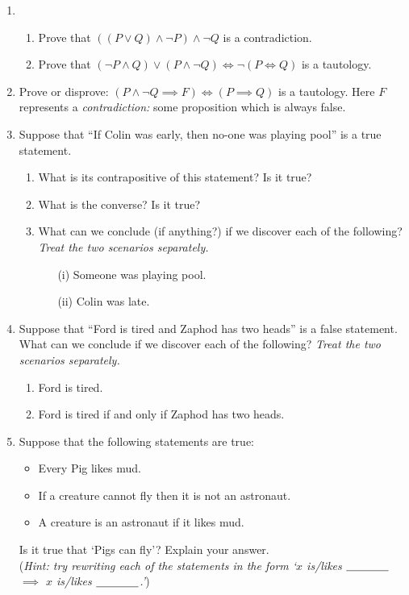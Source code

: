 \begin{enumerate}
  \item\begin{enumerate}
    \item Prove that $((P\vee Q)\wedge \neg P)\wedge\neg Q$ is a contradiction.
  	\item Prove that $(\neg P\wedge Q)\vee(P\wedge\neg Q)\iff\neg(P\iff Q)$ is a tautology.
  \end{enumerate}
  
  \item Prove or disprove: $(P\wedge \neg Q\implies F)\iff (P\implies Q)$ is a tautology. Here $F$ represents a \emph{contradiction:} some proposition which is always false.
		
  \item Suppose that ``If Colin was early, then no-one was playing pool'' is a true statement.\prelistskip
		\begin{enumerate}
	  	\item What is its contrapositive of this statement? Is it true?
	  	\item What is the converse? Is it true?
	  	\item What can we conclude (if anything?) if we discover each of the following? \emph{Treat the two scenarios separately.}
			\begin{enumerate}
	  	  \item[(i)] Someone was playing pool.
	      \item[(ii)] Colin was late.
			\end{enumerate}
		\end{enumerate}\pagebreak[4]

  \item Suppose that ``Ford is tired and Zaphod has two heads'' is a false statement. What can we conclude if we discover each of the following? \emph{Treat the two scenarios separately.}\prelistskip
		\begin{enumerate}
	  	\item Ford is tired.
	  	\item Ford is tired if and only if Zaphod has two heads.
		\end{enumerate}
		
	\item Suppose that the following statements are true:
  \begin{itemize}
    \item Every Pig likes mud.
    \item If a creature cannot fly then it is not an astronaut.
    \item A creature is an astronaut if it likes mud.
  \end{itemize}
  Is it true that `Pigs can fly'? Explain your answer.\\
  (\emph{Hint: try rewriting each of the statements in the form `$x$ is/likes $\underline{\text{\phantom{bobobob}}}$ $\implies$ $x$ is/likes $\underline{\text{\phantom{bobobob}}}$.'})
  

\end{enumerate}
